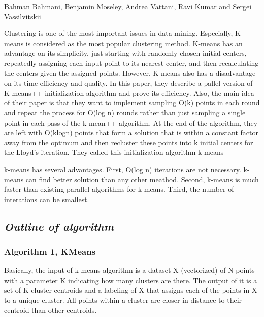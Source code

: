 \documentclass{article}
\begin{document}
Bahman Bahmani, Benjamin Moseley, Andrea Vattani, Ravi Kumar and Sergei
Vassilvitskii

Clustering is one of the most important issues in data mining.
Especially, K-means is considered as the most popular clustering method.
K-means has an advantage on its simplicity, just starting with randomly
chosen initial centers, repeatedly assigning each input point to its
nearest center, and then recalculating the centers given the assigned
points. However, K-means also has a disadvantage on its time efficiency
and quality. In this paper, they describe a pallel version of K-means++
initialization algorithm and prove its efficiency. Also, the main idea
of their paper is that they want to implement sampling O(k) points in
each round and repeat the process for O(log n) rounds rather than just
sampling a single point in each pass of the k-mean++ algorithm. At the
end of the algorithm, they are left with O(klogn) points that form a
solution that is within a constant factor away from the optimum and then
recluster these points into k initial centers for the Lloyd's iteration.
They called this initialization algorithm k-means\textbar{}\textbar{}

k-means\textbar{}\textbar{} has several advantages. First, O(log n)
iterations are not necessary. k-means\textbar{}\textbar{} can find
better solution than any other meathod. Second,
k-means\textbar{}\textbar{} is much faster than existing parallel
algorithms for k-means. Third, the number of interations can be
smallest.

    \subsection{\emph{Outline of algorithm}}\label{outline-of-algorithm}

\subsubsection{\textbf{Algorithm 1, KMeans}}\label{algorithm-1-kmeans}

Basically, the input of k-means algorithm is a dataset X (vectorized) of
N points with a parameter K indicating how many clusters are there. The
output of it is a set of K cluster centroids and a labeling of X that
assigns each of the points in X to a unique cluster. All points within a
cluster are closer in distance to their centroid than other centroids.
\end{document}
